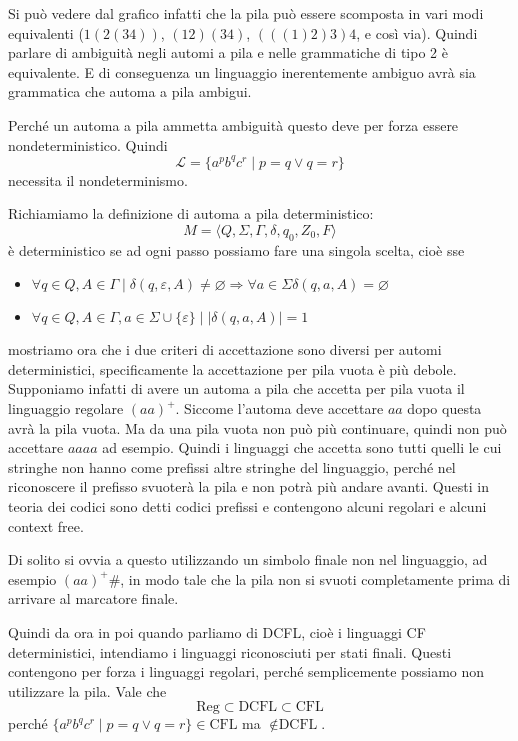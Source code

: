 \documentclass[12pt]{report}
\theoremstyle{definition}
\theoremstyle{regard}
\begin{document}
Si può vedere dal grafico infatti che la pila può essere scomposta in vari modi equivalenti ($1(2(34))$, $(12)(34)$, $(((1)2)3)4$, e così via). %
Quindi parlare di ambiguità negli automi a pila e nelle grammatiche di tipo 2 è equivalente.
E di conseguenza un linguaggio inerentemente ambiguo avrà sia grammatica che automa a pila ambigui.

Perché un automa a pila ammetta ambiguità questo deve per forza essere nondeterministico.
Quindi
$$ \mathcal{L} = \{ a^p b^q c^r \mid p = q \vee q = r \} $$
necessita il nondeterminismo.

Richiamiamo la definizione di automa a pila deterministico:
$$ M = \langle Q, \Sigma, \Gamma, \delta, q_0, Z_0, F \rangle $$
è deterministico se ad ogni passo possiamo fare una singola scelta, cioè sse
\begin{itemize}
	\item $\forall q \in Q, A \in \Gamma \mid \delta(q, \varepsilon, A) \neq \varnothing \Rightarrow \forall a \in \Sigma \delta(q, a, A) = \varnothing $
	\item $\forall q \in Q, A \in \Gamma, a \in \Sigma \cup \{ \varepsilon \} \mid | \delta(q, a, A) | = 1 $
\end{itemize}
mostriamo ora che i due criteri di accettazione sono diversi per automi deterministici, specificamente la accettazione per pila vuota è più debole.
Supponiamo infatti di avere un automa a pila che accetta per pila vuota il linguaggio regolare $(aa)^+$.
Siccome l'automa deve accettare $aa$ dopo questa avrà la pila vuota.
Ma da una pila vuota non può più continuare, quindi non può accettare $aaaa$ ad esempio.
Quindi i linguaggi che accetta sono tutti quelli le cui stringhe non hanno come prefissi altre stringhe del linguaggio, perché nel riconoscere il prefisso svuoterà la pila e non potrà più andare avanti.
Questi in teoria dei codici sono detti codici prefissi e contengono alcuni regolari e alcuni context free.

Di solito si ovvia a questo utilizzando un simbolo finale non nel linguaggio, ad esempio $(aa)^+ \#$, in modo tale che la pila non si svuoti completamente prima di arrivare al marcatore finale.

Quindi da ora in poi quando parliamo di DCFL, cioè i linguaggi CF deterministici, intendiamo i linguaggi riconosciuti per stati finali.
Questi contengono per forza i linguaggi regolari, perché semplicemente possiamo non utilizzare la pila.
Vale che
$$ \text{Reg} \subset \text{DCFL} \subset \text{CFL} $$
perché $\{ a^p b^q c^r \mid p = q \vee q = r \} \in \text{CFL}$ ma $\not \in \text{DCFL}$.
\end{document}
